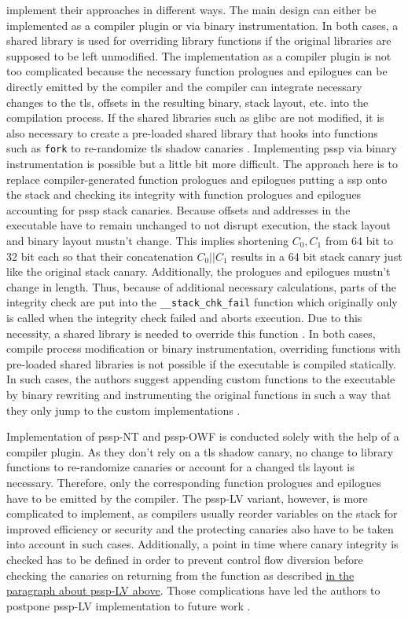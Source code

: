 \bigskip\noindent
{} implement their approaches in different ways.
The main design can either be implemented as a compiler plugin or via binary instrumentation.
In both cases, a shared library is used for overriding library functions if the original libraries are supposed to be left unmodified.
The implementation as a compiler plugin is not too complicated because the necessary function prologues and epilogues can be directly emitted by the compiler and the compiler can integrate necessary changes to the \gls{tls}, offsets in the resulting binary, stack layout, etc. into the compilation process.
If the shared libraries such as \gls{glibc} are not modified, it is also necessary to create a pre-loaded shared library that hooks into functions such as \texttt{fork} to re-randomize \acs{tls} shadow canaries \cite[248\psq]{Wang2018}.
Implementing \gls{pssp} via binary instrumentation is possible but a little bit more difficult.
The approach here is to replace compiler-generated function prologues and epilogues putting a \gls{ssp} onto the stack and checking its integrity with function prologues and epilogues accounting for \gls{pssp} stack canaries.
Because offsets and addresses in the executable have to remain unchanged to not disrupt execution, the stack layout and binary layout mustn't change.
This implies shortening $ C_0, C_1 $ from 64 bit to 32 bit each so that their concatenation $ C_0 || C_1 $ results in a 64 bit stack canary just like the original stack canary.
Additionally, the prologues and epilogues mustn't change in length.
Thus, because of additional necessary calculations, parts of the integrity check are put into the \texttt{\_\_stack\_chk\_fail} function which originally only is called when the integrity check failed and aborts execution.
Due to this necessity, a shared library is needed to override this function \cite[249\psq]{Wang2018}.
In both cases, compile process modification or binary instrumentation, overriding functions with pre-loaded shared libraries is not possible if the executable is compiled statically.
In such cases, the authors suggest appending custom functions to the executable by binary rewriting and instrumenting the original functions in such a way that they only jump to the custom implementations \cite[250]{Wang2018}.

Implementation of \acs{pssp}-NT and \acs{pssp}-OWF is conducted solely with the help of a compiler plugin.
As they don't rely on a \acs{tls} shadow canary, no change to library functions to re-randomize canaries or account for a changed \gls{tls} layout is necessary.
Therefore, only the corresponding function prologues and epilogues have to be emitted by the compiler.
The \acs{pssp}-LV variant, however, is more complicated to implement, as compilers usually reorder variables on the stack for improved efficiency or security and the protecting canaries also have to be taken into account in such cases.
Additionally, a point in time where canary integrity is checked has to be defined in order to prevent control flow diversion before checking the canaries on returning from the function as described \hyperref[subsubsec:p-ssp-lv]{in the paragraph about \acs{pssp}-LV above}.
Those complications have led the authors to postpone \acs{pssp}-LV implementation to future work \cite[250\psq]{Wang2018}.

